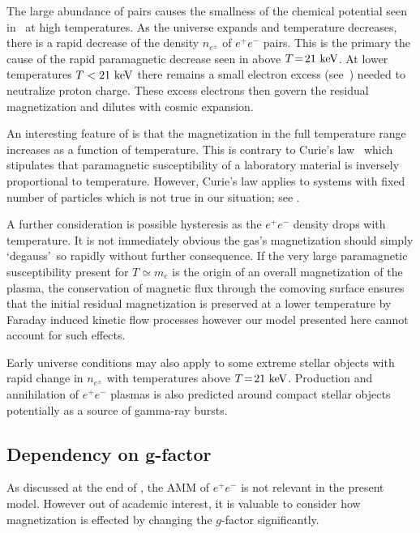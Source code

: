 The large abundance of pairs causes the smallness of the chemical potential seen in~ at high temperatures. As the universe expands and temperature decreases, there is a rapid decrease of the density $n_{e^{\pm}}$ of $e^{+}e^{-}$ pairs. This is the primary the cause of the rapid paramagnetic decrease seen in  above $T\!=\!21\text{ keV}$. At lower temperatures $T<21\text{ keV}$ there remains a small electron excess (see~) needed to neutralize proton charge. These excess electrons then govern the residual magnetization and dilutes with cosmic expansion.

An interesting feature of  is that the magnetization in the full temperature range increases as a function of temperature. This is contrary to Curie's law~\citep{greiner2012thermodynamics} which stipulates that paramagnetic susceptibility of a laboratory material is inversely proportional to temperature. However, Curie's law applies to systems with fixed number of particles which is not true in our situation; see .

A further consideration is possible hysteresis as the $e^{+}e^{-}$ density drops with temperature. It is not immediately obvious the gas's magnetization should simply \lq degauss\rq\ so rapidly without further consequence. If the very large paramagnetic susceptibility present for $T\simeq m_{e}$ is the origin of an overall magnetization of the plasma, the conservation of magnetic flux through the comoving surface ensures that the initial residual magnetization is preserved at a lower temperature by Faraday induced kinetic flow processes however our model presented here cannot account for such effects.

Early universe conditions may also apply to some extreme stellar objects with rapid change in $n_{e^{\pm}}$ with temperatures above $T\!=\!21\text{ keV}$. Production and annihilation of $e^{+}e^{-}$ plasmas is also predicted around compact stellar objects~\citep{Ruffini:2009hg,Ruffini:2012it} potentially as a source of gamma-ray bursts.

\subsection{Dependency on g-factor}
\label{sec:gfac}

\noindent As discussed at the end of , the AMM of $e^{+}e^{-}$ is not relevant in the present model. However out of academic interest, it is valuable to consider how magnetization is effected by changing the $g$-factor significantly.

